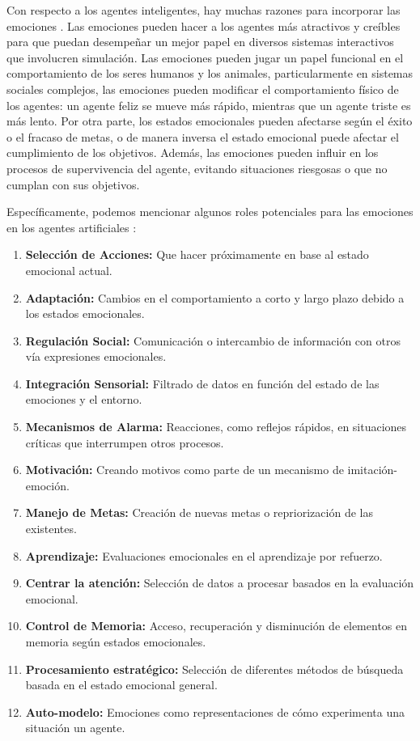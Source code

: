 Con respecto a los agentes inteligentes, hay muchas razones para incorporar las
emociones \citep{jiang2007}. Las emociones pueden hacer a los agentes más
atractivos y creíbles para que puedan desempeñar un mejor papel en diversos
sistemas interactivos que involucren simulación. Las emociones pueden jugar un
papel funcional en el comportamiento de los seres humanos y los animales,
particularmente en sistemas sociales complejos, las emociones pueden modificar
el comportamiento físico de los agentes: un agente feliz se mueve más rápido,
mientras que un agente triste es más lento. Por otra parte, los estados
emocionales pueden afectarse según el éxito o el fracaso de metas, o de manera
inversa el estado emocional puede afectar el cumplimiento de los objetivos.
Además, las emociones pueden influir en los procesos de supervivencia del
agente, evitando situaciones riesgosas o que no cumplan con sus objetivos.

Específicamente, podemos mencionar algunos roles potenciales para las emociones
en los agentes artificiales \citep{maria2007}:

\begin{enumerate}
\item \textbf{Selección de Acciones:} Que hacer próximamente en base al estado emocional
actual.
\item \textbf{Adaptación:} Cambios en el comportamiento a corto y largo plazo debido
a los estados emocionales.
\item \textbf{Regulación Social:} Comunicación o intercambio de
información con otros vía expresiones emocionales.
\item \textbf{Integración Sensorial:} Filtrado de datos en función del estado de las
emociones y el entorno.
\item \textbf{Mecanismos de Alarma:} Reacciones, como reflejos rápidos, en situaciones críticas
que interrumpen otros procesos.
\item \textbf{Motivación:} Creando motivos como parte de un
mecanismo de imitación-emoción.
\item \textbf{Manejo de Metas:} Creación de nuevas metas o
repriorización de las existentes.
\item \textbf{Aprendizaje:} Evaluaciones emocionales en el
aprendizaje por refuerzo.
\item \textbf{Centrar la atención:} Selección de datos a procesar
basados en la evaluación emocional.
\item \textbf{Control de Memoria:} Acceso, recuperación
y disminución de elementos en memoria según estados emocionales.
\item \textbf{Procesamiento estratégico:} Selección de diferentes métodos de búsqueda basada en
el estado emocional general.
\item \textbf{Auto-modelo:} Emociones como representaciones de
cómo experimenta una situación un agente.
\end{enumerate}


